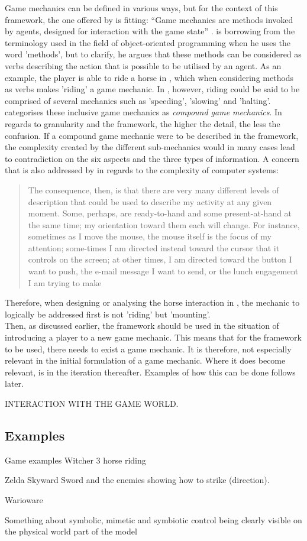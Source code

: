 Game mechanics can be defined in various ways, but for the context of this framework, the one offered by  is fitting: ``Game mechanics are methods invoked by agents, designed for interaction with the game state'' \cite{sicartmechanic}.  is borrowing from the terminology used in the field of object-oriented programming when he uses the word 'methods', but to clarify, he argues that these methods can be considered as verbs describing the action that is possible to be utilised by an agent. As an example, the player is able to ride a horse in , which when considering methods as verbs makes 'riding' a game mechanic. In , however, riding could be said to be comprised of several mechanics such as 'speeding', 'slowing' and 'halting'.  categorises these inclusive game mechanics as \textit{compound game mechanics}. In regards to granularity and the framework, the higher the detail, the less the confusion. If a compound game mechanic were to be described in the framework, the complexity created by the different sub-mechanics would in many cases lead to contradiction on the six aspects and the three types of information. A concern that is also addressed by  in regards to the complexity of computer systems:
\begin{quote}
  The consequence, then, is that there are very many different levels of description that could be used to describe my activity at any given moment. Some, perhaps, are ready-to-hand and some present-at-hand at the same time; my orientation toward them each will change. For instance, sometimes as I move the mouse, the mouse itself is the focus of my attention; some-times I am directed instead toward the cursor that it controls on the screen; at other times, I am directed toward the button I want to push, the e-mail message I want to send, or the lunch engagement I am trying to make \cite[p. 140]{dourish}
\end{quote}
Therefore, when designing or analysing the horse interaction in , the mechanic to logically be addressed first is not 'riding' but 'mounting'. \\
Then, as discussed earlier, the framework should be used in the situation of introducing a player to a new game mechanic. This means that for the framework to be used, there needs to exist a game mechanic. It is therefore, not especially relevant in the initial formulation of a game mechanic. Where it does become relevant, is in the iteration thereafter. Examples of how this can be done follows later.

INTERACTION WITH THE GAME WORLD.


\subsection{Examples}
Game examples Witcher 3 horse riding

Zelda Skyward Sword and the enemies showing how to strike (direction).

Warioware

Something about symbolic, mimetic and symbiotic control being clearly visible on the physical world part of the model \cite[p. 64]{calleja}
